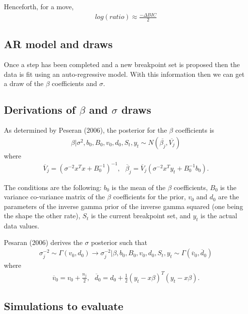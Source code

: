 \documentclass[submit]{smj}
\begin{document}
Henceforth, for a move, 
\begin{align*}
log(ratio) \approx \frac{- \Delta BIC}{2} 
\end{align*}

\subsection{AR model and draws}
Once a step has been completed and a new breakpoint set is proposed then the data is fit using an auto-regressive model.  With this information then we can get a draw of the $\beta$ coefficients and $\sigma$.

\subsection{Derivations of $\beta$ and $\sigma$ draws}

As determined by Peseran (2006), the posterior for the $\beta$ coefficients is 
\begin{align*}
\beta | \sigma^2, b_0, B_0, v_0, d_0 , S_{t}, y_{t} \sim N( \overline{\beta_j } , \overline{V_j} )
\end{align*}
where 
\begin{align*}
\overline{V}_j = (\sigma^{-2}x^Tx + B_0^{-1})^{-1}, \ \ \  \overline{\beta}_j = \overline{V}_j(\sigma^{-2}x^Ty_t + B_0^{-1}b_0).
\end{align*}

The conditions are the following: $b_0$ is the mean of the $\beta$ coefficients, $B_0$ is the variance co-variance matrix of the $\beta$ coefficients for the prior, $v_0$ and $d_0$ are the parameters of the inverse gamma prior of the inverse gamma squared (one being the shape the other rate), $S_t$ is the current breakpoint set, and $y_t$ is the actual data values. 


Pesaran (2006) derives the $\sigma$ posterior such that 
\begin{align*}
\sigma_j^{-2} \sim  \Gamma(v_0, d_0) \longrightarrow \sigma^{-2}_j | \beta, b_0, B_0, v_0, d_0 , S_{t}, y_{t} \sim \Gamma ( \overline{v}_0,  \overline{d}_0)
\end{align*}
where 
\begin{align*}
\overline{v}_0 = v_0 + \frac{n_j}{2} , \ \ \  \overline{d}_0 = d_0 + \frac{1}{2}(y_t-x\beta)^T(y_t-x\beta).
\end{align*}


\subsection{Simulations to evaluate}
\end{document}
